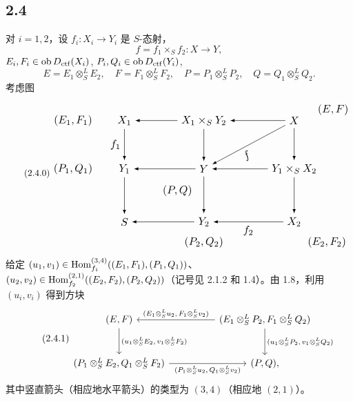 \subsection*{2.4}
对 $i=1,2$，设 $f_i:X_i\to Y_i$ 是 $S$-态射，
\[
f=f_1\times_S f_2:X\to Y,
\]
$E_i,F_i\in\operatorname{ob} D_{\mathrm{ctf}}(X_i)$, $P_i,Q_i\in\operatorname{ob} D_{\mathrm{ctf}}(Y_i)$,
\[
E=E_1\otimes^{L}_{S}E_2,
\quad F=F_1\otimes^{L}_{S}F_2,
\quad P=P_1\otimes^{L}_{S}P_2,
\quad Q=Q_1\otimes^{L}_{S}Q_2.
\]
考虑图
\begin{equation}\tag{2.4.0}
\resizebox{0.96\textwidth}{!}{%
\begin{tikzpicture}[>=latex,baseline=(current bounding box.center)]
\node (EF1) at (-5.2,2.0) {$(E_1,F_1)$};
\node (X1)  at (-3.55,2.0) {$X_1$};
\node (X1Y2) at (-1.0,2.0) {$X_1\times_S Y_2$};
\node (X) at (1.9,2.0) {$X$};
\node (EF) at (3.15,2.35) {$(E,F)$};
\node (PQ1) at (-5.2,0.45) {$(P_1,Q_1)$};
\node (Y1) at (-3.55,0.45) {$Y_1$};
\node (Y) at (-1.0,0.45) {$Y$};
\node (Y1X2) at (1.9,0.45) {$Y_1\times_S X_2$};
\node (S) at (-3.55,-1.25) {$S$};
\node (Y2) at (-1.0,-1.25) {$Y_2$};
\node (X2) at (1.9,-1.25) {$X_2$};
\node (PQ) at (-1.85,-0.25) {$(P,Q)$};
\node (PQ2) at (-1.0,-1.9) {$(P_2,Q_2)$};
\node (EF2) at (2.95,-1.9) {$(E_2,F_2)$};
\draw[->] (X1Y2) -- (X1);
\draw[->] (X) -- (X1Y2);
\draw[->] (X1) -- node[left] {$f_1$} (Y1);
\draw[->] (X1Y2) -- (Y);
\draw[->] (X) -- (Y1X2);
\draw[->] (X) -- node[below,sloped,pos=.58] {$f$} (Y);
\draw[->] (Y) -- (Y1);
\draw[->] (Y1X2) -- (Y);
\draw[->] (Y1) -- (S);
\draw[->] (Y) -- (Y2);
\draw[->] (Y1X2) -- (X2);
\draw[->] (Y2) -- (S);
\draw[->] (X2) -- node[below] {$f_2$} (Y2);
\end{tikzpicture}}
\end{equation}
给定 $(u_1,v_1)\in\operatorname{Hom}_{f_1}^{(3,4)}((E_1,F_1),(P_1,Q_1))$、$(u_2,v_2)\in\operatorname{Hom}_{f_2}^{(2,1)}((E_2,F_2),(P_2,Q_2))$（记号见 2.1.2 和 1.4）。由 1.8，利用 $(u_i,v_i)$ 得到方块
\begin{equation}\tag{2.4.1}
\begin{tikzcd}[column sep=huge,row sep=large]
(E,F) \arrow[d,"{(u_1\otimes^L_S E_2,\,v_1\otimes^L_S F_2)}"] & (E_1\otimes^L_S P_2,F_1\otimes^L_S Q_2) \arrow[l,"{(E_1\otimes^L_S u_2,\,F_1\otimes^L_S v_2)}"'] \arrow[d,"{(u_1\otimes^L_S P_2,\,v_1\otimes^L_S Q_2)}"]\\
(P_1\otimes^L_S E_2,Q_1\otimes^L_S F_2) \arrow[r,"{(P_1\otimes^L_S u_2,\,Q_1\otimes^L_S v_2)}"'] & (P,Q),
\end{tikzcd}
\end{equation}
其中竖直箭头（相应地水平箭头）的类型为 $(3,4)$（相应地 $(2,1)$）。

